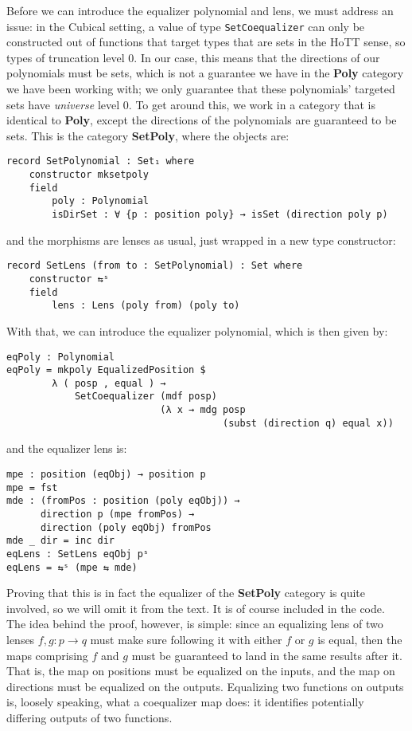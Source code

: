 Before we can introduce the equalizer polynomial and lens, we must address an issue: in the Cubical setting, a value of type \texttt{SetCoequalizer} can only be constructed out of functions that target types that are sets in the HoTT sense, so types of truncation level 0. In our case, this means that the directions of our polynomials must be sets, which is not a guarantee we have in the \textbf{Poly} category we have been working with; we only guarantee that these polynomials' targeted sets have \textit{universe} level 0. To get around this, we work in a category that is identical to \textbf{Poly}, except the directions of the polynomials are guaranteed to be sets. This is the category \textbf{SetPoly}, where the objects are:

\begin{verbatim}
record SetPolynomial : Set₁ where
    constructor mksetpoly
    field
        poly : Polynomial
        isDirSet : ∀ {p : position poly} → isSet (direction poly p)
\end{verbatim}
and the morphisms are lenses as usual, just wrapped in a new type constructor:
\begin{verbatim}
record SetLens (from to : SetPolynomial) : Set where
    constructor ⇆ˢ
    field
        lens : Lens (poly from) (poly to)
\end{verbatim}

With that, we can introduce the equalizer polynomial, which is then given by:
\begin{verbatim}
eqPoly : Polynomial
eqPoly = mkpoly EqualizedPosition $ 
        λ ( posp , equal ) → 
            SetCoequalizer (mdf posp) 
                           (λ x → mdg posp 
                                      (subst (direction q) equal x))
\end{verbatim}
and the equalizer lens is:
\begin{verbatim}
mpe : position (eqObj) → position p
mpe = fst
mde : (fromPos : position (poly eqObj)) → 
      direction p (mpe fromPos) → 
      direction (poly eqObj) fromPos
mde _ dir = inc dir
eqLens : SetLens eqObj pˢ
eqLens = ⇆ˢ (mpe ⇆ mde)
\end{verbatim}

Proving that this is in fact the equalizer of the \textbf{SetPoly} category is quite involved, so we will omit it from the text. It is of course included in the code. The idea behind the proof, however, is simple: since an equalizing lens of two lenses $f,g : p \rightarrow q$ must make sure following it with either $f$ or $g$ is equal, then the maps comprising $f$ and $g$ must be guaranteed to land in the same results after it. That is, the map on positions must be equalized on the inputs, and the map on directions must be equalized on the outputs. Equalizing two functions on outputs is, loosely speaking, what a coequalizer map does: it identifies potentially differing outputs of two functions.

